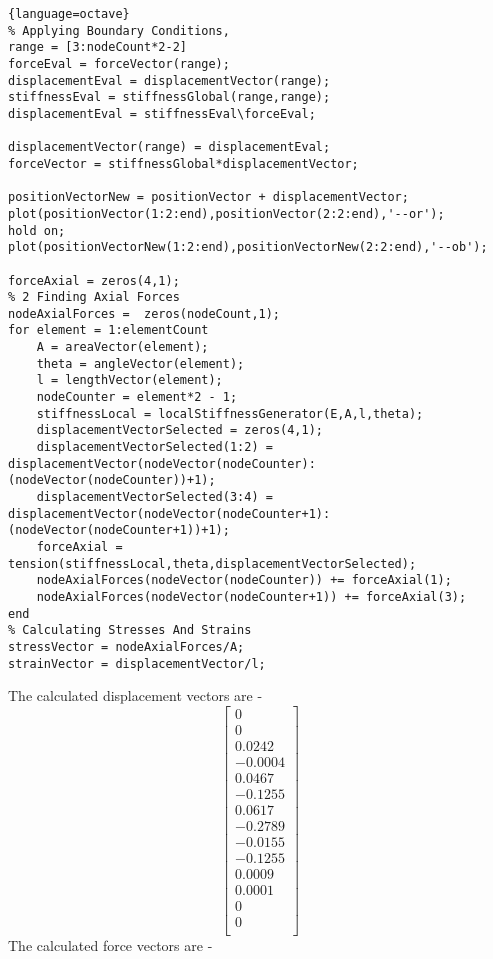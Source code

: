 \documentclass{article}
\begin{document}
\begin{lstlisting}{language=octave}
% Applying Boundary Conditions,
range = [3:nodeCount*2-2]
forceEval = forceVector(range);
displacementEval = displacementVector(range);
stiffnessEval = stiffnessGlobal(range,range);
displacementEval = stiffnessEval\forceEval;

displacementVector(range) = displacementEval;
forceVector = stiffnessGlobal*displacementVector;

positionVectorNew = positionVector + displacementVector;
plot(positionVector(1:2:end),positionVector(2:2:end),'--or');
hold on;
plot(positionVectorNew(1:2:end),positionVectorNew(2:2:end),'--ob');

forceAxial = zeros(4,1);
% 2 Finding Axial Forces
nodeAxialForces =  zeros(nodeCount,1);
for element = 1:elementCount
    A = areaVector(element);
    theta = angleVector(element);
    l = lengthVector(element);
    nodeCounter = element*2 - 1;
    stiffnessLocal = localStiffnessGenerator(E,A,l,theta);
    displacementVectorSelected = zeros(4,1);
    displacementVectorSelected(1:2) = displacementVector(nodeVector(nodeCounter):(nodeVector(nodeCounter))+1);
    displacementVectorSelected(3:4) = displacementVector(nodeVector(nodeCounter+1):(nodeVector(nodeCounter+1))+1);
    forceAxial = tension(stiffnessLocal,theta,displacementVectorSelected);
    nodeAxialForces(nodeVector(nodeCounter)) += forceAxial(1);
    nodeAxialForces(nodeVector(nodeCounter+1)) += forceAxial(3);
end
% Calculating Stresses And Strains
stressVector = nodeAxialForces/A;
strainVector = displacementVector/l;
\end{lstlisting}
The calculated displacement vectors are - 
\[
    \begin{bmatrix}
                0 \\
        0 \\
   0.0242 \\
  -0.0004 \\
   0.0467 \\
  -0.1255 \\
   0.0617 \\
  -0.2789 \\
  -0.0155 \\
  -0.1255 \\
   0.0009 \\
   0.0001 \\
        0 \\
        0 \\
    \end{bmatrix}
\]
The calculated force vectors are - 
\end{document}
